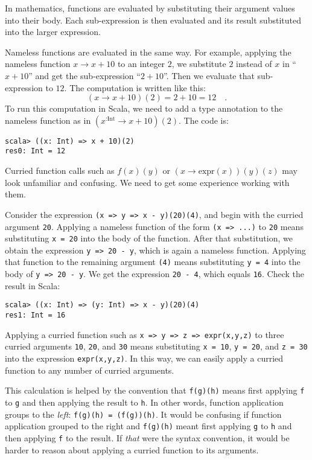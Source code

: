 In mathematics, functions are evaluated by substituting their argument
values into their body. Each sub-expression is then evaluated and
its result substituted into the larger expression.

Nameless functions are evaluated in the same way. For example, applying
the nameless function $x\rightarrow x+10$ to an integer $2$, we
substitute $2$ instead of $x$ in \textquotedblleft $x+10$\textquotedblright{}
and get the sub-expression \textquotedblleft $2+10$\textquotedblright .
Then we evaluate that sub-expression to $12$. The computation is
written like this:
\[
(x\rightarrow x+10)(2)=2+10=12\quad.
\]
To run this computation in Scala, we need to add a type annotation
to the nameless function as in $(x^{:\text{Int}}\rightarrow x+10)(2)$.
The code is:
\begin{lstlisting}
scala> ((x: Int) => x + 10)(2)
res0: Int = 12 
\end{lstlisting}

Curried function calls such as $f(x)(y)$ or $\left(x\rightarrow\text{expr}(x)\right)(y)(z)$
may look unfamiliar and confusing. We need to get some experience
working with them.

Consider the expression \lstinline!(x => y => x - y)(20)(4)!, and
begin with the curried argument \lstinline!20!. Applying a nameless
function of the form \lstinline!(x => ...)! to \lstinline!20! means
substituting \lstinline!x = 20! into the body of the function. After
that substitution, we obtain the expression \lstinline!y => 20 - y!,
which is again a nameless function. Applying that function to the
remaining argument \lstinline!(4)! means substituting \lstinline!y = 4!
into the body of \lstinline!y => 20 - y!. We get the expression \lstinline!20 - 4!,
which equals \lstinline!16!. Check the result in Scala:
\begin{lstlisting}
scala> ((x: Int) => (y: Int) => x - y)(20)(4)
res1: Int = 16
\end{lstlisting}

Applying a curried function such as \lstinline!x => y => z => expr(x,y,z)!
to three curried arguments \lstinline!10!, \lstinline!20!, and \lstinline!30!
means substituting \lstinline!x = 10!, \lstinline!y = 20!, and \lstinline!z = 30!
into the expression \lstinline!expr(x,y,z)!. In this way, we can
easily apply a curried function to any number of curried arguments.

This calculation is helped by the convention that \lstinline!f(g)(h)!
means first applying \lstinline!f! to \lstinline!g! and then applying
the result to \lstinline!h!. In other words, function application
groups to the \emph{left}: \lstinline!f(g)(h) = (f(g))(h)!. It would
be confusing if function application grouped to the right and \lstinline!f(g)(h)!
meant first applying \lstinline!g! to \lstinline!h! and then applying
\lstinline!f! to the result. If \emph{that} were the syntax convention,
it would be harder to reason about applying a curried function to
its arguments.

